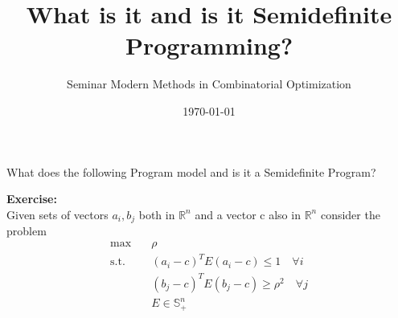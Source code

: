 \documentclass[a4paper]{scrartcl}
\title{What is it and is it Semidefinite Programming?}
\subtitle{Seminar Modern Methods in Combinatorial Optimization}
\date{\today}
\theoremstyle{plain}
\begin{document}
	\maketitle
	\noindent
	What does the following Program model and is it a Semidefinite Program?
	\bigskip
	
	\textbf{Exercise:}\\
	Given sets of vectors $a_i,b_j$ both in $\mathbb{R}^n$ and a vector c also in $\mathbb{R}^n$ consider the problem
	\begin{equation*}
	\begin{aligned}
	\max\quad& \rho\\
	\text{s.t.}\quad&(a_i-c)^TE(a_i-c)\leq 1\quad\forall i\\
	&(b_j-c)^TE(b_j-c)\geq \rho^2\quad\forall j\\
	& E\in\mathbb{S}^n_+
	\end{aligned}
	\end{equation*}
	
\end{document}
